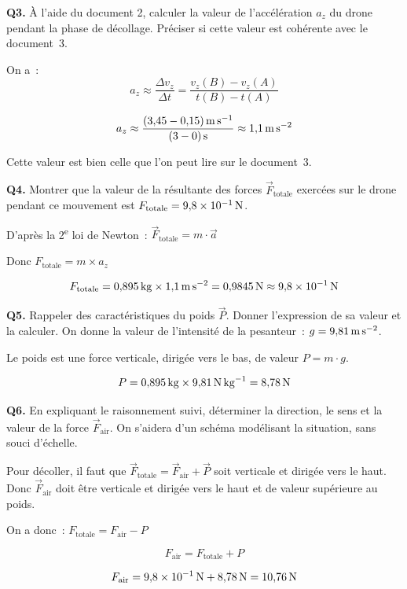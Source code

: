 \noindent
\textbf{Q3.} À l’aide du document 2, calculer la valeur de l’accélération $a_z$ du drone pendant la phase de décollage. Préciser si cette valeur est cohérente avec le document~3.

\begin{reponse}
On a~:
\[
a_z \approx \frac{\Delta v_z}{\Delta t} = \frac{v_z(B) - v_z(A)}{t(B) - t(A)}
\]

\[
a_z \approx \frac{(3{,}45 - 0{,}15)\,\si{\meter\per\second}}{(3 - 0)\,\si{\second}} \approx \SI{1{,}1}{\meter\per\second\squared}
\]

Cette valeur est bien celle que l’on peut lire sur le document~3.
\end{reponse}
\vspace{1em}

\noindent
\textbf{Q4.} Montrer que la valeur de la résultante des forces $\vec{F}_{\text{totale}}$ exercées sur le drone pendant ce mouvement est $F_{\text{totale}} = \SI{9{,}8e-1}{\newton}$.

\begin{reponse}
D’après la 2\textsuperscript{e} loi de Newton~: $\vec{F}_{\text{totale}} = m \cdot \vec{a}$

Donc $F_{\text{totale}} = m \times a_z$

\[
F_{\text{totale}} = 0{,}895\,\si{\kilo\gram} \times \SI{1{,}1}{\meter\per\second\squared} = \SI{0{,}9845}{\newton} \approx \SI{9{,}8e-1}{\newton}
\]
\end{reponse}
\vspace{1em}

\noindent
\textbf{Q5.} Rappeler des caractéristiques du poids $\vec{P}$. Donner l’expression de sa valeur et la calculer. On donne la valeur de l’intensité de la pesanteur~: $g = \SI{9{,}81}{\meter\per\second\squared}$.

\begin{reponse}
Le poids est une force verticale, dirigée vers le bas, de valeur $P = m \cdot g$.

\[
P = 0{,}895\,\si{\kilo\gram} \times \SI{9{,}81}{\newton\per\kilo\gram} = \SI{8{,}78}{\newton}
\]
\end{reponse}
\vspace{1em}

\noindent
\textbf{Q6.} En expliquant le raisonnement suivi, déterminer la direction, le sens et la valeur de la force $\vec{F}_{\text{air}}$. On s’aidera d’un schéma modélisant la situation, sans souci d’échelle.

\begin{reponse}
Pour décoller, il faut que $\vec{F}_{\text{totale}} = \vec{F}_{\text{air}} + \vec{P}$ soit verticale et dirigée vers le haut.
Donc $\vec{F}_{\text{air}}$ doit être verticale et dirigée vers le haut et de valeur supérieure au poids.

On a donc~: $F_{\text{totale}} = F_{\text{air}} - P$

\[
F_{\text{air}} = F_{\text{totale}} + P
\]

\[
F_{\text{air}} = \SI{9{,}8e-1}{\newton} + \SI{8{,}78}{\newton} = \SI{10{,}76}{\newton}
\]
\end{reponse}
